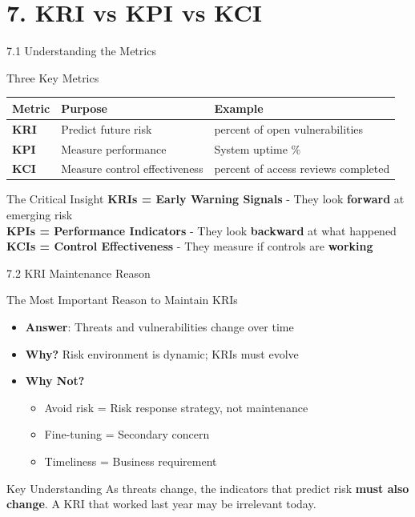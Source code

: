 \documentclass{beamer}
\begin{document}
	\section{7. KRI vs KPI vs KCI}
	
	\begin{frame}{7.1 Understanding the Metrics}
		\begin{block}{Three Key Metrics}
			\begin{tabular}{|p{2.5cm}|p{4cm}|p{4.5cm}|}
				\hline
				\textbf{Metric} & \textbf{Purpose} & \textbf{Example} \\
				\hline
				\textbf{KRI} & Predict future risk & percent of open vulnerabilities \\
				\hline
				\textbf{KPI} & Measure performance & System uptime \% \\
				\hline
				\textbf{KCI} & Measure control effectiveness & percent of access reviews completed \\
				\hline
			\end{tabular}
		\end{block}
		
		\begin{alertblock}{The Critical Insight}
			\textbf{KRIs = Early Warning Signals} - They look \textbf{forward} at emerging risk \\
			\textbf{KPIs = Performance Indicators} - They look \textbf{backward} at what happened \\
			\textbf{KCIs = Control Effectiveness} - They measure if controls are \textbf{working}
		\end{alertblock}
	\end{frame}
	
	\begin{frame}{7.2 KRI Maintenance Reason}
		\begin{block}{The Most Important Reason to Maintain KRIs}
			\begin{itemize}
				\item \textbf{Answer}: Threats and vulnerabilities change over time
				\item \textbf{Why?} Risk environment is dynamic; KRIs must evolve
				\item \textbf{Why Not?}
				\begin{itemize}
					\item Avoid risk = Risk response strategy, not maintenance
					\item Fine-tuning = Secondary concern
					\item Timeliness = Business requirement
				\end{itemize}
			\end{itemize}
		\end{block}
		
		\begin{exampleblock}{Key Understanding}
			As threats change, the indicators that predict risk \textbf{must also change}. A KRI that worked last year may be irrelevant today.
		\end{exampleblock}
	\end{frame}
	
\end{document}
